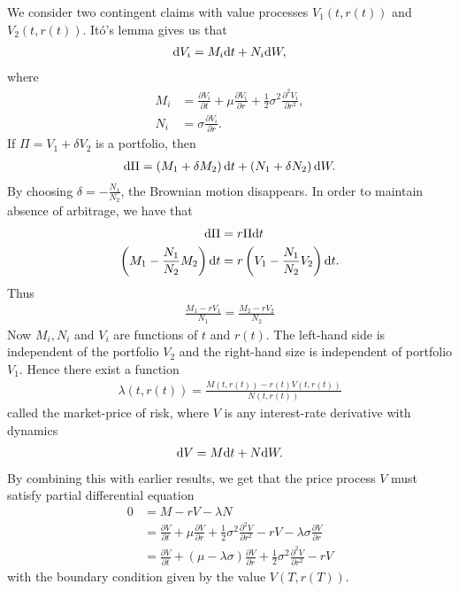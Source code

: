 We consider two contingent claims with value processes $V_1(t, r(t))$ and $V_2(t,r(t))$. It\'{o}'s lemma gives us that
\begin{align}
\mathrm{d} V_i = M_i \mathrm{d} t + N_i \mathrm{d} W,
\end{align}
where
\begin{align}
M_i &= \frac{\partial V_i}{\partial t} + \mu \frac{\partial V_i}{\partial r} + \frac{1}{2} \sigma^2 \frac{\partial^2 V_i}{\partial r^2}, \\
N_i &= \sigma \frac{\partial V_i}{\partial r} .
\end{align}
If $\Pi = V_1 + \delta V_2$ is a portfolio, then
\begin{align}
\mathrm{d} \Pi = \left( M_1 + \delta M_2 \right) \mathrm{d} t + \left( N_1 + \delta N_2 \right) \mathrm{d} W .
\end{align}
By choosing $\delta = - \frac{N_1}{N_2}$, the Brownian motion disappears. In order to maintain absence of arbitrage, we have that 
\begin{align}
\mathrm{d} \Pi &= r \Pi \mathrm{d} t \\
\left( M_1 - \frac{N_1}{N_2} M_2 \right) \mathrm{d} t &= r \left( V_1 - \frac{N_1}{N_2} V_2 \right) \mathrm{d} t .
\end{align}
Thus
\begin{align}
\frac{M_1 - r V_1}{N_1 } = \frac{M_2 - r V_2}{N_2}
\end{align}
Now $M_i, N_i$ and $V_i$ are functions of $t$ and $r(t)$. The left-hand side is independent of the portfolio $V_2$ and the right-hand size is independent of portfolio $V_1$. Hence there exist a function
\begin{align}
\lambda(t,r(t)) = \frac{M(t,r(t)) - r(t) V(t,r(t))}{N(t,r(t))}
\end{align}
called the market-price of risk, where $V$ is any interest-rate derivative with dynamics
\begin{align}
\mathrm{d} V = M \mathrm{d} t + N \mathrm{d} W .
\end{align}
By combining this with earlier results, we get that the price process $V$ must satisfy partial differential equation
\begin{align}
\label{termstructureequation}
0 &= M - rV - \lambda N \\
&= \frac{\partial V}{\partial t} + \mu \frac{\partial V}{\partial r} + \frac{1}{2} \sigma^2 \frac{\partial^2 V}{\partial r^2} - rV - \lambda \sigma \frac{\partial V}{\partial r} \\
&= \frac{\partial V}{\partial t} + \left( \mu - \lambda \sigma \right) \frac{\partial V}{\partial r} + \frac{1}{2} \sigma^2 \frac{\partial^2 V}{\partial r^2} - rV
\end{align}
with the boundary condition given by the value $V(T, r(T))$.

